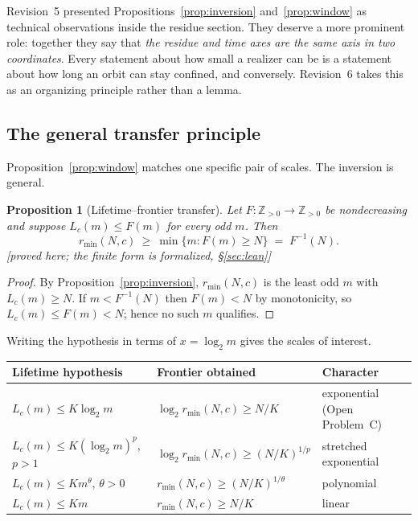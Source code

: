 \documentclass[11pt]{article}
\theoremstyle{plain}
\newtheorem{proposition}[theorem]{Proposition}
\theoremstyle{definition}
\theoremstyle{remark}
\newcommand{\rmin}{r_{\min}}
\newcommand{\status}[1]{\textsf{\footnotesize[#1]}}
\begin{document}
Revision~5 presented Propositions~\ref{prop:inversion} and~\ref{prop:window} as technical
observations inside the residue section. They deserve a more prominent role: together they say that
\emph{the residue and time axes are the same axis in two coordinates}. Every statement about how
small a realizer can be is a statement about how long an orbit can stay confined, and conversely.
Revision~6 takes this as an organizing principle rather than a lemma.

\subsection{The general transfer principle}\label{sec:transfer}

Proposition~\ref{prop:window} matches one specific pair of scales. The inversion is general.

\begin{proposition}[Lifetime--frontier transfer]\label{prop:transfer}
Let $F:\mathbb{Z}_{>0}\to\mathbb{Z}_{>0}$ be nondecreasing and suppose $L_c(m)\le F(m)$ for every
odd $m$. Then
\[
\rmin(N,c)\ \ge\ \min\{m: F(m)\ge N\}\;=\;F^{-1}(N).
\]
\status{proved here; the finite form is formalized, \S\ref{sec:lean}}
\end{proposition}

\begin{proof}
By Proposition~\ref{prop:inversion}, $\rmin(N,c)$ is the least odd $m$ with $L_c(m)\ge N$. If
$m<F^{-1}(N)$ then $F(m)<N$ by monotonicity, so $L_c(m)\le F(m)<N$; hence no such $m$ qualifies.
\end{proof}

Writing the hypothesis in terms of $x=\log_2 m$ gives the scales of interest.

\begin{center}
\begin{tabular}{@{}lll@{}}
\toprule
Lifetime hypothesis & Frontier obtained & Character \\
\midrule
$L_c(m)\le K\log_2 m$ & $\log_2\rmin(N,c)\ge N/K$ & exponential (Open Problem~C) \\
$L_c(m)\le K(\log_2 m)^p$, $p>1$ & $\log_2\rmin(N,c)\ge(N/K)^{1/p}$ & stretched exponential \\
$L_c(m)\le K m^{\theta}$, $\theta>0$ & $\rmin(N,c)\ge(N/K)^{1/\theta}$ & polynomial \\
$L_c(m)\le K m$ & $\rmin(N,c)\ge N/K$ & linear \\
\bottomrule
\end{tabular}
\end{center}
\end{document}
